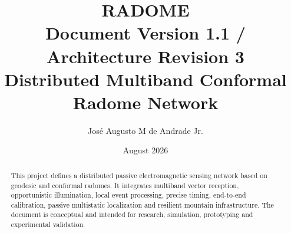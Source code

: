\documentclass[11pt,a4paper]{report}
\title{\textbf{RADOME}\\[0.35em]\large Document Version 1.1 / Architecture Revision 3\\[0.5em]Distributed Multiband Conformal Radome Network}
\author{José Augusto M de Andrade Jr.}
\date{August 2026}
\begin{document}
\hypersetup{pageanchor=false}
\maketitle
\begin{abstract}
This project defines a distributed passive electromagnetic sensing network based on geodesic and conformal radomes. It integrates multiband vector reception, opportunistic illumination, local event processing, precise timing, end-to-end calibration, passive multistatic localization and resilient mountain infrastructure. The document is conceptual and intended for research, simulation, prototyping and experimental validation.
\end{abstract}
\clearpage
\hypersetup{pageanchor=true}
\tableofcontents
\listoffigures



\end{document}
